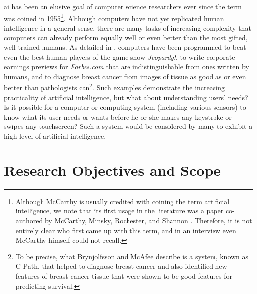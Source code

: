 \gls{ai} has been an elusive goal of computer science researchers ever since the term was coined in 1955\footnote{Although McCarthy is usually credited with coining the term artificial intelligence, we note that its first usage in the literature was a paper co-authored by McCarthy, Minsky, Rochester, and Shannon \cite{McCarthy1955}. Therefore, it is not entirely clear who first came up with this term, and in an interview even McCarthy himself could not recall\cite{crevier1993ai}.%
}. Although computers have not yet replicated human intelligence in a general sense, there are many tasks of increasing complexity that computers can already perform equally well or even better than the most gifted, well-trained humans. As detailed in \cite{brynjolfsson_2014}, computers have been programmed to beat even the best human players of the game-show \emph{Jeopardy!}, to write corporate earnings previews for \emph{Forbes.com} that are indistinguishable from ones written by humans, and to diagnose breast cancer from images of tissue as good as or even better than pathologists can\footnote{To be precise, what Brynjolfsson and McAfee describe is a system, known as C-Path, that helped to diagnose breast cancer and also identified new features of breast cancer tissue that were shown to be good features for predicting survival.}. Such examples demonstrate the increasing practicality of artificial intelligence, but what about understanding users' needs? Is it possible for a computer or computing system (including various sensors) to know what its user needs or wants before he or she makes any keystroke or swipes any touchscreen? Such a system would be considered by many to exhibit a high level of artificial intelligence.

\section{Research Objectives and Scope}
\label{sec:objectives}

